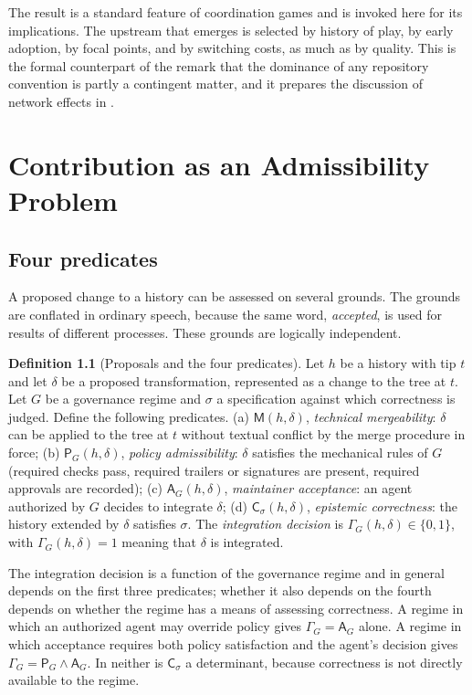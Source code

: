 \documentclass[11pt,twoside,openright]{book}
\theoremstyle{plain}
\theoremstyle{definition}
\newtheorem{definition}[theorem]{Definition}
\theoremstyle{remark}
\begin{document}
The result is a standard feature of coordination games and is invoked here for its implications. The upstream that emerges is selected by history of play, by early adoption, by focal points, and by switching costs, as much as by quality. This is the formal counterpart of the remark that the dominance of any repository convention is partly a contingent matter, and it prepares the discussion of network effects in .

\chapter{Contribution as an Admissibility Problem}\label{ch:admissibility}

\section{Four predicates}

A proposed change to a history can be assessed on several grounds. The grounds are conflated in ordinary speech, because the same word, \emph{accepted}, is used for results of different processes. These grounds are logically independent.

\begin{definition}[Proposals and the four predicates]\label{def:fourpred}
Let $h$ be a history with tip $t$ and let $\delta$ be a proposed transformation, represented as a change to the tree at $t$. Let $G$ be a governance regime and $\sigma$ a specification against which correctness is judged. Define the following predicates.
(a) $\mathsf{M}(h,\delta)$, \emph{technical mergeability}: $\delta$ can be applied to the tree at $t$ without textual conflict by the merge procedure in force; (b) $\mathsf{P}_G(h,\delta)$, \emph{policy admissibility}: $\delta$ satisfies the mechanical rules of $G$ (required checks pass, required trailers or signatures are present, required approvals are recorded); (c) $\mathsf{A}_G(h,\delta)$, \emph{maintainer acceptance}: an agent authorized by $G$ decides to integrate $\delta$; (d) $\mathsf{C}_\sigma(h,\delta)$, \emph{epistemic correctness}: the history extended by $\delta$ satisfies $\sigma$.
The \emph{integration decision} is $\Gamma_G(h,\delta)\in\{0,1\}$, with $\Gamma_G(h,\delta)=1$ meaning that $\delta$ is integrated.
\end{definition}

The integration decision is a function of the governance regime and in general depends on the first three predicates; whether it also depends on the fourth depends on whether the regime has a means of assessing correctness. A regime in which an authorized agent may override policy gives $\Gamma_G=\mathsf{A}_G$ alone. A regime in which acceptance requires both policy satisfaction and the agent's decision gives $\Gamma_G=\mathsf{P}_G\wedge\mathsf{A}_G$. In neither is $\mathsf{C}_\sigma$ a determinant, because correctness is not directly available to the regime.
\end{document}
